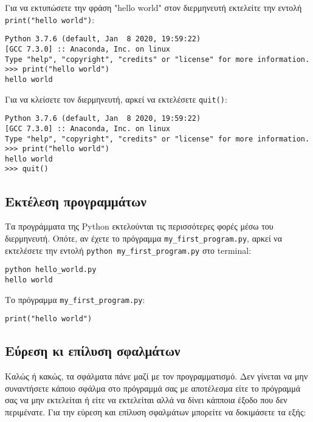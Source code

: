 \documentclass[14pt]{extreport}
\begin{document}
Για να εκτυπώσετε την φράση "hello world" στον διερμηνευτή εκτελείτε την εντολή \lstinline{print("hello world")}:
\begin{lstlisting}[numbers=none]
Python 3.7.6 (default, Jan  8 2020, 19:59:22) 
[GCC 7.3.0] :: Anaconda, Inc. on linux
Type "help", "copyright", "credits" or "license" for more information.
>>> print("hello world")
hello world
\end{lstlisting}

Για να κλείσετε τον διερμηνευτή, αρκεί να εκτελέσετε \lstinline{quit()}:

\begin{lstlisting}[numbers=none]
Python 3.7.6 (default, Jan  8 2020, 19:59:22) 
[GCC 7.3.0] :: Anaconda, Inc. on linux
Type "help", "copyright", "credits" or "license" for more information.
>>> print("hello world")
hello world
>>> quit()
\end{lstlisting}

\subsection{Εκτέλεση προγραμμάτων}

Τα προγράμματα της Python εκτελούνται τις περισσότερες φορές μέσω του διερμηνευτή. Οπότε, αν έχετε το πρόγραμμα \lstinline{my_first_program.py}, αρκεί να εκτελέσετε την εντολή \lstinline{python my_first_program.py} στο terminal:

\begin{lstlisting}[numbers=none]
python hello_world.py
hello world    
\end{lstlisting}

Το πρόγραμμα \lstinline{my_first_program.py}:
\begin{lstlisting}
print("hello world")
\end{lstlisting}

\subsection{Εύρεση κι επίλυση σφαλμάτων}

Καλώς ή κακώς, τα σφάλματα πάνε μαζί με τον προγραμματισμό. Δεν γίνεται να μην συναντήσετε κάποιο σφάλμα στο πρόγραμμά σας με αποτέλεσμα είτε το πρόγραμμά σας να μην εκτελείται ή είτε να εκτελείται αλλά να δίνει κάπποια έξοδο που δεν περιμένατε. Για την εύρεση και επίλυση σφαλμάτων μπορείτε να δοκιμάσετε τα εξής:
\end{document}
